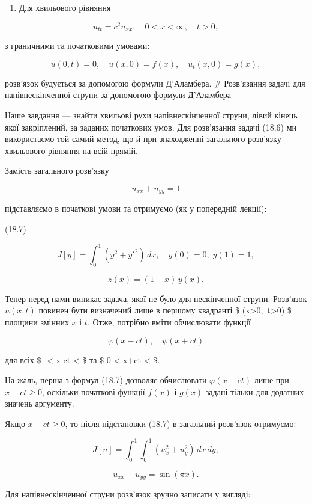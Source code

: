 \documentclass[
  ukrainian,
]{article}
\providecommand{\tightlist}{%
  \setlength{\itemsep}{0pt}\setlength{\parskip}{0pt}}
\begin{document}
\begin{enumerate}
\def\labelenumi{\arabic{enumi}.}
\setcounter{enumi}{1}
\tightlist
\item
  Для хвильового рівняння
\end{enumerate}

\[
u_{tt}=c^2u_{xx}, \quad 0<x<\infty,\quad t>0,
\]

з граничними та початковими умовами:

\[
u(0,t)=0,\quad u(x,0)=f(x),\quad u_t(x,0)=g(x),
\]

розв'язок будується за допомогою формули Д'Аламбера. \# Розв'язання
задачі для напівнескінченної струни за допомогою формули Д'Аламбера

Наше завдання --- знайти хвильові рухи напівнескінченної струни, лівий
кінець якої закріплений, за заданих початкових умов. Для розв'язання
задачі (18.6) ми використаємо той самий метод, що й при знаходженні
загального розв'язку хвильового рівняння на всій прямій.

Замість загального розв'язку

\[ u_{xx} + u_{yy} = 1
\]

підставляємо в початкові умови та отримуємо (як у попередній лекції):

(18.7)

\[ J[y] = \int_{0}^{1} (y^{2} + {y'}^{2})\,dx,\quad y(0) = 0,\; y(1) = 1,
\]

\[ z(x) = (1 - x)\, y(x).
\]

Тепер перед нами виникає задача, якої не було для нескінченної струни.
Розв'язок \(u(x,t)\) повинен бути визначений лише в першому квадранті \$
(x\textgreater0,~t\textgreater0) \$ площини змінних \(x\) і \(t\). Отже,
потрібно вміти обчислювати функції

\[
\varphi(x-ct), \quad \psi(x+ct)
\]

для всіх \$ -\infty \textless{} x-ct \textless{} \infty \$ та \$ 0
\textless{} x+ct \textless{} \infty \$.

На жаль, перша з формул (18.7) дозволяє обчислювати \(\varphi(x-ct)\)
лише при \(x-ct \ge 0\), оскільки початкові функції \(f(x)\) і \(g(x)\)
задані тільки для додатних значень аргументу.

Якщо \(x - ct \ge 0\), то після підстановки (18.7) в загальний розв'язок
отримуємо:

\[
J[u] = \int_{0}^{1} \int_{0}^{1} (u_{x}^{2} + u_{y}^{2})\,dx\,dy,
\]

\[
u_{xx} + u_{yy} = \sin(\pi x).
\]

Для напівнескінченної струни розв'язок зручно записати у вигляді:
\end{document}
